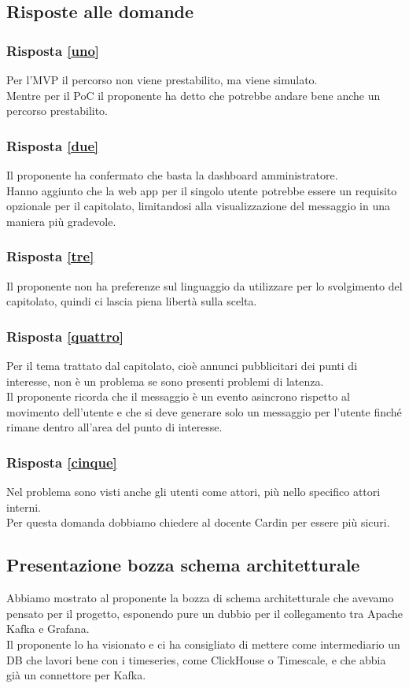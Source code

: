 \documentclass[12pt]{article}
\begin{document}
\subsection{Risposte alle domande}
\subsubsection{Risposta \ref{uno}}
Per l'MVP il percorso non viene prestabilito, ma viene simulato.\\
Mentre per il PoC il proponente ha detto che potrebbe andare bene anche un percorso prestabilito.
\subsubsection{Risposta \ref{due}}
Il proponente ha confermato che basta la dashboard amministratore.\\
Hanno aggiunto che la web app per il singolo utente potrebbe essere un requisito opzionale per il capitolato, limitandosi alla visualizzazione del messaggio in una maniera più gradevole.
\subsubsection{Risposta \ref{tre}}
Il proponente non ha preferenze sul linguaggio da utilizzare per lo svolgimento del capitolato, quindi ci lascia piena libertà sulla scelta.\\
\subsubsection{Risposta \ref{quattro}}
Per il tema trattato dal capitolato, cioè annunci pubblicitari dei punti di interesse, non è un problema se sono presenti problemi di latenza.\\
Il proponente ricorda che il messaggio è un evento asincrono rispetto al movimento dell'utente e che si deve generare solo un messaggio per l'utente finché rimane dentro all'area del punto di interesse.
\subsubsection{Risposta \ref{cinque}}
Nel problema sono visti anche gli utenti come attori, più nello specifico attori interni.\\
Per questa domanda dobbiamo chiedere al docente Cardin per essere più sicuri.

\subsection{Presentazione bozza schema architetturale}
Abbiamo mostrato al proponente la bozza di schema architetturale che avevamo pensato per il progetto, esponendo pure un dubbio per il collegamento tra Apache Kafka e Grafana.\\
Il proponente lo ha visionato e ci ha consigliato di mettere come intermediario un DB che lavori bene con i timeseries, come ClickHouse o Timescale, e che abbia già un connettore per Kafka.
\end{document}
